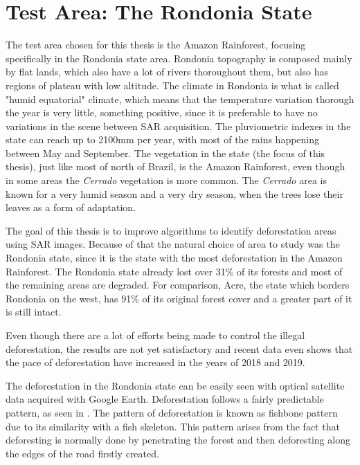 


\section{Test Area: The Rondonia State}
\par
The test area chosen for this thesis is the Amazon Rainforest, focusing specifically in the Rondonia state area. Rondonia topography is composed mainly by flat lands, which also have a lot of rivers thoroughout them, but also has regions of plateau with low altitude. The climate in Rondonia is what is called "humid equatorial" climate, which means that the temperature variation thorough the year is very little, something positive, since it is preferable to have no variations in the scene between SAR acquisition. The pluviometric indexes in the state can reach up to 2100mm per year, with most of the rains happening between May and September. The vegetation in the state (the focus of this thesis), just like most of north of Brazil, is the Amazon Rainforest, even though in some areas the \textit{Cerrado} vegetation is more common. The \textit{Cerrado} area is known for a very humid season and a very dry season, when the trees lose their leaves as a form of adaptation.
\par
The goal of this thesis is to improve algorithms to identify deforestation areas using SAR images. Because of that the natural choice of area to study was the Rondonia state, since it is the state with the most deforestation in the Amazon Rainforest. The Rondonia state already lost over 31\% of its forests and most of the remaining areas are degraded. For comparison, Acre, the state which borders Rondonia on the west, has 91\% of its original forest cover and a greater part of it is still intact. 
\par
Even though there are a lot of efforts being made to control the illegal deforestation, the results are not yet satisfactory and recent data even shows that the pace of deforestation have increased in the years of 2018 and 2019.\par
The deforestation in the Rondonia state can be easily seen with optical satellite data acquired with Google Earth. Deforestation follows a fairly predictable pattern, as seen in . The pattern of deforestation is known as fishbone pattern due to its similarity with a fish skeleton. This pattern arises from the fact that deforesting is normally done by penetrating the forest and then deforesting along the edges of the road firstly created.

